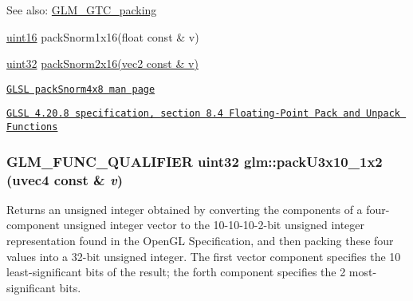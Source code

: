 \begin{Desc}
\item[See also:]\hyperlink{group__gtc__packing}{GLM\_\-GTC\_\-packing} 

\hyperlink{group__gtc__type__precision_gd8c2939e1fdd8e5828b31d95c52255d5}{uint16} packSnorm1x16(float const \& v) 

\hyperlink{group__gtc__type__precision_g202b6a53c105fcb7e531f9b443518451}{uint32} \hyperlink{group__core__func__packing_g0c8005de240d6c4ca3d16c7bee25c622}{packSnorm2x16(vec2 const \& v)} 

\href{http://www.opengl.org/sdk/docs/manglsl/xhtml/packSnorm4x8.xml}{\tt GLSL packSnorm4x8 man page} 

\href{http://www.opengl.org/registry/doc/GLSLangSpec.4.20.8.pdf}{\tt GLSL 4.20.8 specification, section 8.4 Floating-Point Pack and Unpack Functions} \end{Desc}
\hypertarget{group__gtc__packing_gf656d8862628f96b20de7a36eaa1fe56}{
\subsubsection[packU3x10\_\-1x2]{\setlength{\rightskip}{0pt plus 5cm}GLM\_\-FUNC\_\-QUALIFIER uint32 glm::packU3x10\_\-1x2 (uvec4 const \& {\em v})}}
\label{group__gtc__packing_gf656d8862628f96b20de7a36eaa1fe56}


Returns an unsigned integer obtained by converting the components of a four-component unsigned integer vector to the 10-10-10-2-bit unsigned integer representation found in the OpenGL Specification, and then packing these four values into a 32-bit unsigned integer. The first vector component specifies the 10 least-significant bits of the result; the forth component specifies the 2 most-significant bits.

